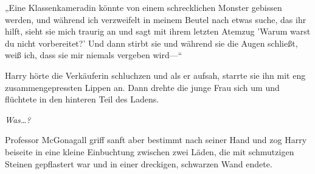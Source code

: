 „Eine Klassenkameradin könnte von einem schrecklichen Monster gebissen werden, und während ich verzweifelt in meinem Beutel nach etwas suche, das ihr hilft, sieht sie mich traurig an und sagt mit ihrem letzten Atemzug 'Warum warst du nicht vorbereitet?' Und dann stirbt sie und während sie die Augen schließt, weiß ich, dass sie mir niemals vergeben wird—“

Harry hörte die Verkäuferin schluchzen und als er aufsah, starrte sie ihn mit eng zusammengepressten Lippen an. Dann drehte die junge Frau sich um und flüchtete in den hinteren Teil des Ladens.

\emph{Was…? }

Professor McGonagall griff sanft aber bestimmt nach seiner Hand und zog Harry beiseite in eine kleine Einbuchtung zwischen zwei Läden, die mit schmutzigen Steinen gepflastert war und in einer dreckigen, schwarzen Wand endete.

